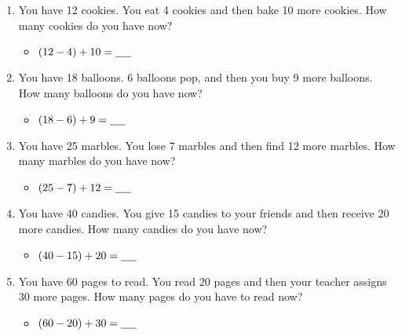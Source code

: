 \begin{enumerate}[label=(\alph*)]
    \item You have 12 cookies. You eat 4 cookies and then bake 10 more cookies. How many cookies do you have now?
    \begin{itemize}
        \item $(12 - 4) + 10 = \underline{\hspace{0.5cm}}$
    \end{itemize}
    \item You have 18 balloons. 6 balloons pop, and then you buy 9 more balloons. How many balloons do you have now?
    \begin{itemize}
        \item $(18 - 6) + 9 = \underline{\hspace{0.5cm}}$
    \end{itemize}
    \item You have 25 marbles. You lose 7 marbles and then find 12 more marbles. How many marbles do you have now?
    \begin{itemize}
        \item $(25 - 7) + 12 = \underline{\hspace{0.5cm}}$
    \end{itemize}
    \item You have 40 candies. You give 15 candies to your friends and then receive 20 more candies. How many candies do you have now?
    \begin{itemize}
        \item $(40 - 15) + 20 = \underline{\hspace{0.5cm}}$
    \end{itemize}
    \item You have 60 pages to read. You read 20 pages and then your teacher assigns 30 more pages. How many pages do you have to read now?
    \begin{itemize}
        \item $(60 - 20) + 30 = \underline{\hspace{0.5cm}}$
    \end{itemize}
\end{enumerate}

